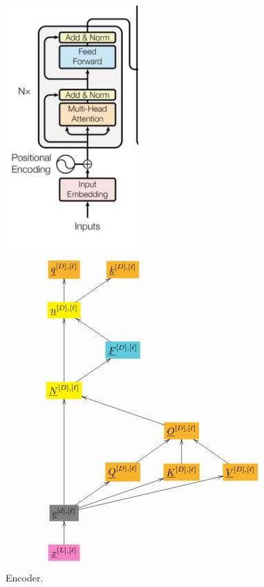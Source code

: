 \documentclass[12pt]{article}
\begin{document}
\begin{figure}[h!]\centering
\begin{minipage}{.5\linewidth}
\includegraphics[width=2in]{encoder.jpg}
\end{minipage}%
\begin{minipage}{.5\linewidth}
$$\xymatrix{
*+[F*:Dandelion]{\underline{q}^{[D], [\ell]}}&*+[F*:Dandelion]{\underline{k}^{[D], [\ell]}}&&
\\
*+[F*:yellow]{\underline{n}^{[D], [\ell]}}\ar[ur]\ar[u]&&&
\\
&*+[F*:SkyBlue]{\underline{F}^{[D], [\ell]}}\ar[ul]&&
\\
*+[F*:yellow]{\underline{N}^{[D], [\ell]}}\ar[ur]\ar[uu]&&&
\\
&&*+[F*:Dandelion]{\underline{O}^{[D], [\ell]}}\ar[ull]&
\\
&*+[F*:Dandelion]{\underline{Q}^{[D], [\ell]}}\ar[ur]&*+[F*:Dandelion]{\underline{K}^{[D], [\ell]}}\ar[u]&*+[F*:Dandelion]{\underline{V}^{[D],[\ell]}}\ar[ul]
\\
*+[F*:gray]{\underline{e}^{[d], [\ell]}}\ar[urr]\ar[uuu]\ar[ur]\ar[urrr]&&&
\\
*+[F*:Lavender]{\underline{x}^{[L],[\ell]}}\ar[u]&&&
}$$
\end{minipage}
\caption{Encoder.}
\label{fig-texnn-for-encoder}
\end{figure}
\end{document}
